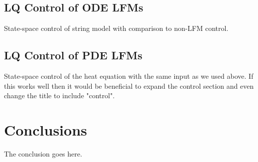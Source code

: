 \documentclass[journal]{IEEEtran}
\newcommand{\simo}[1]{{\color{red}#1}}
\begin{document}
\subsection{LQ Control of ODE LFMs}

\simo{State-space control of string model with comparison to non-LFM control.}

\subsection{LQ Control of PDE LFMs}

\simo{State-space control of the heat equation with the same input as we used above. If this works well then it would be beneficial to expand the control section and even change the title to include "control".}




\section{Conclusions}
The conclusion goes here.






%
\end{document}
